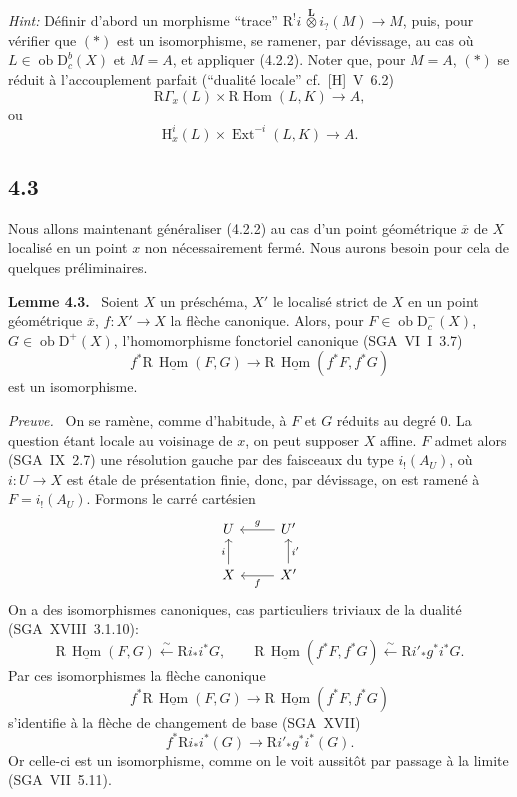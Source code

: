 \documentclass[11pt]{article}
\newenvironment{statement}[1]{\par\medskip\noindent\textbf{#1.}\ }{\par\medskip}
\newenvironment{prooftext}[1][Proof]{\par\noindent\emph{#1.}\ }{\par\medskip}
\renewcommand{\H}{\mathrm{H}}
\DeclareMathOperator{\Hom}{Hom}
\DeclareMathOperator{\Ext}{Ext}
\newcommand{\R}{\mathrm{R}}
\newcommand{\D}{\mathrm{D}}
\newcommand{\ob}{\operatorname{ob}}
\newcommand{\ol}[1]{\overline{#1}}
\providecommand{\Hom}{\operatorname{Hom}}
\providecommand{\ob}{\operatorname{ob}}
\providecommand{\R}{\mathrm R}
\providecommand{\Hom}{\operatorname{Hom}}
\begin{document}
\emph{Hint:} Définir d'abord un morphisme ``trace'' $\R^{!}i\,\overset{\mathbf L}{\otimes}i_?(M)\to M$, puis, pour vérifier que $(*)$ est un isomorphisme, se ramener, par dévissage, au cas où $L\in\ob\D_c^b(X)$ et $M=A$, et appliquer (4.2.2). Noter que, pour $M=A$, $(*)$ se réduit à l'accouplement parfait (``dualité locale'' cf.~[H]~V~6.2)
\[
\R\Gamma_x(L)\times \R\Hom(L,K)\longrightarrow A,
\]
ou
\[
\H_x^i(L)\times \Ext^{-i}(L,K)\longrightarrow A.
\]

\subsection*{4.3}
Nous allons maintenant généraliser (4.2.2) au cas d'un point géométrique $\ol{x}$ de $X$ localisé en un point $x$ non nécessairement fermé. Nous aurons besoin pour cela de quelques préliminaires.

\begin{statement}{Lemme 4.3}
Soient $X$ un préschéma, $X'$ le localisé strict de $X$ en un point géométrique $\ol{x}$, $f:X'\to X$ la flèche canonique. Alors, pour $F\in\ob\D_c^-(X)$, $G\in\ob\D^+(X)$, l'homomorphisme fonctoriel canonique (SGA~VI~I~3.7)
\[
f^*\R\,\underline{\Hom}(F,G)\longrightarrow \R\,\underline{\Hom}(f^*F,f^*G)
\]
est un isomorphisme.
\end{statement}

\begin{prooftext}[Preuve]
On se ramène, comme d'habitude, à $F$ et $G$ réduits au degré $0$. La question étant locale au voisinage de $x$, on peut supposer $X$ affine. $F$ admet alors (SGA~IX~2.7) une résolution gauche par des faisceaux du type $i_!(A_U)$, où $i:U\to X$ est étale de présentation finie, donc, par dévissage, on est ramené à $F=i_!(A_U)$. Formons le carré cartésien
\[
\begin{tikzcd}
U & U' \arrow[l,"g"'] \\
X \arrow[u,"i"] & X' \arrow[l,"f"] \arrow[u,"i'"']
\end{tikzcd}
\]
On a des isomorphismes canoniques, cas particuliers triviaux de la dualité (SGA~XVIII~3.1.10):
\[
\R\,\underline{\Hom}(F,G)\xleftarrow{\sim}\R i_* i^*G,
\qquad
\R\,\underline{\Hom}(f^*F,f^*G)\xleftarrow{\sim}\R i'_* g^*i^*G.
\]
Par ces isomorphismes la flèche canonique
\[
f^*\R\,\underline{\Hom}(F,G)\longrightarrow \R\,\underline{\Hom}(f^*F,f^*G)
\]
s'identifie à la flèche de changement de base (SGA~XVII)
\[
f^*\R i_*i^*(G)\longrightarrow \R i'_*g^*i^*(G).
\]
Or celle-ci est un isomorphisme, comme on le voit aussitôt par passage à la limite (SGA~VII~5.11).
\end{prooftext}
\end{document}
